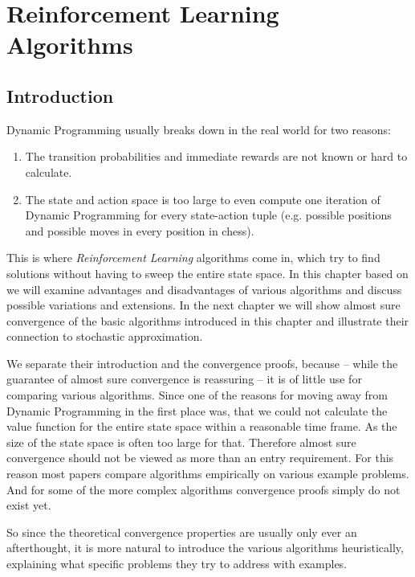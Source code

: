 
\chapter{Reinforcement Learning Algorithms}

\section{Introduction}

Dynamic Programming usually breaks down in the real world for two reasons:
\begin{enumerate}
    \item The transition probabilities and immediate rewards are not known or hard to calculate.
    \item The state and action space is too large to even compute one iteration of Dynamic Programming for every state-action tuple (e.g. possible positions and possible moves in every position in chess).
\end{enumerate}

This is where \emph{Reinforcement Learning} algorithms come in, which try to find solutions without having to sweep the entire state space. In this chapter based on \textcite{suttonReinforcementLearningIntroduction1998} we will examine advantages and disadvantages of various algorithms and discuss possible variations and extensions. In the next chapter we will show almost sure convergence of the basic algorithms introduced in this chapter and illustrate their connection to stochastic approximation.  

We separate their introduction and the convergence proofs, because -- while the guarantee of almost sure convergence is reassuring -- it is of little use for comparing various algorithms. Since one of the reasons for moving away from Dynamic Programming in the first place was, that we could not calculate the value function for the entire state space within a reasonable time frame. As the size of the state space is often too large for that.  Therefore almost sure convergence should not be viewed as more than an entry requirement. For this reason most papers compare algorithms empirically on various example problems. And for some of the more complex algorithms convergence proofs simply do not exist yet. 

So since the theoretical convergence properties are usually only ever an afterthought, it is more natural to introduce the various algorithms heuristically, explaining what specific problems they try to address with examples.


